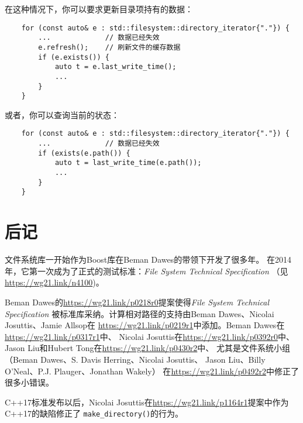 在这种情况下，你可以要求更新目录项持有的数据：
\begin{lstlisting}
    for (const auto& e : std::filesystem::directory_iterator{"."}) {
        ...             // 数据已经失效
        e.refresh();    // 刷新文件的缓存数据
        if (e.exists()) {
            auto t = e.last_write_time();
            ...
        }
    }
\end{lstlisting}
或者，你可以查询当前的状态：
\begin{lstlisting}
    for (const auto& e : std::filesystem::directory_iterator{"."}) {
        ...             // 数据已经失效
        if (exists(e.path()) {
            auto t = last_write_time(e.path());
            ...
        }
    }
\end{lstlisting}


\section{后记}
文件系统库一开始作为Boost库在Beman Dawes的带领下开发了很多年。
在2014年，它第一次成为了正式的测试标准：\emph{File System Technical Specification}
（见\url{https://wg21.link/n4100})。

Beman Dawes的\url{https://wg21.link/p0218r0}提案使得\emph{File System Technical Specification}
被标准库采纳。计算相对路径的支持由Beman Dawes、Nicolai Josuttis、Jamie Allsop在
\url{https://wg21.link/p0219r1}中添加。Beman Dawes在\url{https://wg21.link/p0317r1}中、
Nicolai Josuttis在\url{https://wg21.link/p0392r0}中、Jason Liu和Hubert Tong在\url{https://wg21.link/p0430r2}中、
尤其是文件系统小组
（Beman Dawes、S. Davis Herring、Nicolai Josuttis、 Jason Liu、Billy O’Neal、P.J. Plauger、Jonathan Wakely）
在\url{https://wg21.link/p0492r2}中修正了很多小错误。

C++17标准发布以后，Nicolai Josuttis在\url{https://wg21.link/p1164r1}提案中作为C++17的缺陷修正了
\texttt{make\_directory()}的行为。